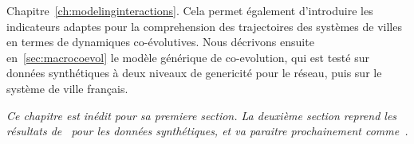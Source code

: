 Chapitre~\ref{ch:modelinginteractions}. Cela permet également d'introduire les indicateurs adaptes pour la comprehension des trajectoires des systèmes de villes en termes de dynamiques co-évolutives. Nous décrivons ensuite en~\ref{sec:macrocoevol} le modèle générique de co-evolution, qui est testé sur données synthétiques à deux niveaux de genericité pour le réseau, puis sur le système de ville français.




\stars


\textit{Ce chapitre est inédit pour sa premiere section. La deuxième section reprend les résultats de~\cite{} %
pour les données synthétiques, et va paraitre prochainement comme~\cite{}. %
}















